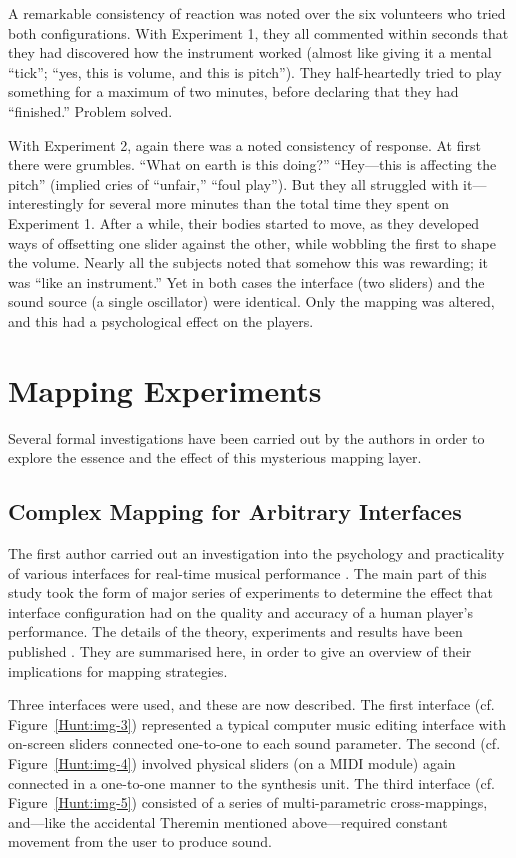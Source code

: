 A remarkable consistency of reaction was noted over the six volunteers who tried
both configurations.  With Experiment 1, they all commented within seconds that
they had discovered how the instrument worked (almost like giving it a mental
``tick''; ``yes, this is volume, and this is pitch'').  They half-heartedly tried to
play something for a maximum of two minutes, before declaring that they had
``finished.''  Problem solved.

With Experiment 2, again there was a noted consistency of response.  At first
there were grumbles.  ``What on earth is this doing?''  ``Hey---this is affecting
the pitch''  (implied cries of ``unfair,'' ``foul play'').  But they all struggled
with it---interestingly for several more minutes than the total time they spent
on Experiment 1.   After a while, their bodies started to move, as they developed
ways of offsetting one slider against the other, while wobbling the first to
shape the volume.  Nearly all the subjects noted that somehow this was rewarding;
it was ``like an instrument.''  Yet in both cases the interface (two sliders) and
the sound source (a single oscillator) were identical.  Only the mapping was
altered, and this had a psychological effect on the players.

\section{Mapping Experiments}

Several formal investigations have been carried out by the authors in order to
explore the essence and the effect of this mysterious mapping layer.

\subsection{Complex Mapping for Arbitrary Interfaces}

The first author carried out an investigation into the psychology and practicality of various interfaces for real-time musical performance \cite{Hunt:1999}.  The main part of this study took the form of major series of experiments to determine the effect that interface configuration had on the quality and accuracy of a human player's performance.  The details of the theory, experiments and results have been published \cite{Hunt:2000}.  They are summarised here, in order to give an overview of their implications for mapping strategies.

Three interfaces were used, and these are now described. The first interface (cf. Figure~\ref{Hunt:img-3}) represented a typical computer music editing interface with on-screen sliders connected one-to-one to each sound parameter. The second (cf. Figure~\ref{Hunt:img-4}) involved physical sliders (on a MIDI module) again connected in a one-to-one manner to the synthesis unit. The third interface (cf. Figure~\ref{Hunt:img-5}) consisted of a series of multi-parametric cross-mappings, and---like the accidental Theremin mentioned above---required constant movement from the user to produce sound.


